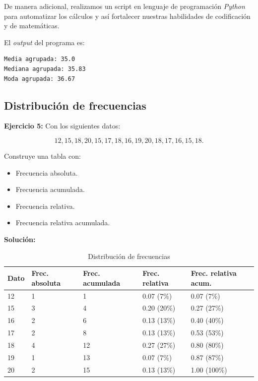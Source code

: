 \documentclass[12pt]{article}
\begin{document}
De manera adicional, realizamos un script en lenguaje de programación \textit{Python} para automatizar los cálculos y así fortalecer nuestras habilidades de codificación y de matemáticas.


El \textit{output} del programa es:
\begin{verbatim}
Media agrupada: 35.0
Mediana agrupada: 35.83
Moda agrupada: 36.67
\end{verbatim}

\subsection*{\centering Distribución de frecuencias}
\textbf{Ejercicio 5:} Con los siguientes datos:

\[12, 15, 18, 20, 15, 17, 18, 16, 19, 20, 18, 17, 16, 15, 18.\]

Construye una tabla con:
\begin{itemize}
    \item Frecuencia absoluta.
    \item Frecuencia acumulada.
    \item Frecuencia relativa.
    \item Frecuencia relativa acumulada.
\end{itemize}

\textbf{Solución: }

\begin{table}[h!]
    \begin{center}
        \begin{tabular}{|l|l|l|l|l|}
            \hline
            Dato & Frec. absoluta & Frec. acumulada & Frec. relativa & Frec. relativa acum. \\
            \hline
            12 & 1 & 1 & 0.07 (7\%) & 0.07 (7\%) \\
            15 & 3 & 4 & 0.20 (20\%) & 0.27 (27\%) \\
            16 & 2 & 6 & 0.13 (13\%) & 0.40 (40\%) \\
            17 & 2 & 8 & 0.13 (13\%) & 0.53 (53\%) \\
            18 & 4 & 12 & 0.27 (27\%) & 0.80 (80\%) \\
            19 & 1 & 13 & 0.07 (7\%) & 0.87 (87\%) \\
            20 & 2 & 15 & 0.13 (13\%) & 1.00 (100\%) \\
            \hline
        \end{tabular}
        \caption{Distribución de frecuencias}
        \label{tab:tabla_frecuencias}
    \end{center}
\end{table}
\end{document}
